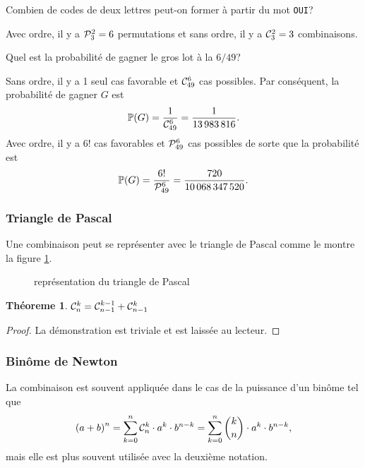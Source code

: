 \documentclass[11pt]{article}
\newcommand\comb[2]{%
	\ensuremath{%
		\mathcal{C}_{#2}^{#1}%
	}%
}%
\newcommand\perm[2]{%
	\ensuremath{%
		\mathcal{P}_{#2}^{#1}%
	}%
}%
\renewcommand\P{%
	\ensuremath{%
		\mathbb{P}%
	}%
}%
\newtheorem{theoreme}{Théoreme}[section]
\begin{document}
\begin{exemple}
	Combien de codes de deux lettres peut-on former à partir du mot
	\texttt{OUI}?
	
	Avec ordre, il y a $\perm{2}{3}=6$ permutations et sans ordre, il y a
	$\comb{2}{3}=3$ combinaisons.
\end{exemple}

\begin{exemple}
	Quel est la probabilité de gagner le gros lot à la $6/49$?
	
	Sans ordre, il y a 1 seul cas favorable et $\comb{6}{49}$ cas possibles.
	Par conséquent, la probabilité de gagner $G$ est
	\begin{equation*}
		\P(G)=\frac{1}{\comb{6}{49}}=\frac{1}{\SI{13983816}{}}.
	\end{equation*}
	Avec ordre, il y a $6!$ cas favorables et $\perm{6}{49}$ cas possibles de
	sorte que la probabilité est
	\begin{equation*}
		\P(G)=\frac{6!}{\perm{6}{49}}=\frac{720}{\SI{10068347520}{}}.
	\end{equation*}
\end{exemple}

\subsubsection{Triangle de Pascal}
Une combinaison peut se représenter avec le triangle de Pascal comme le montre
la figure \ref{fig:pascal}.

\begin{figure}[H]
	\centering
	
	\caption{représentation du triangle de Pascal}
	\label{fig:pascal}
\end{figure}

\begin{theoreme}
	$\comb{k}{n}=\comb{k-1}{n-1}+\comb{k}{n-1}$
\end{theoreme}

\begin{proof}
	La démonstration est triviale et est laissée au lecteur.
\end{proof}

\subsubsection{Binôme de Newton}
La combinaison est souvent appliquée dans le cas de la puissance d'un binôme
tel que
\begin{equation*}
	\left(a+b\right)^n
	=\sum_{k=0}^n\comb{k}{n}\cdot a^k\cdot b^{n-k}
	=\sum_{k=0}^n{{k}\choose{n}}\cdot a^k\cdot b^{n-k},
\end{equation*}
mais elle est plus souvent utilisée avec la deuxième notation.
\end{document}
